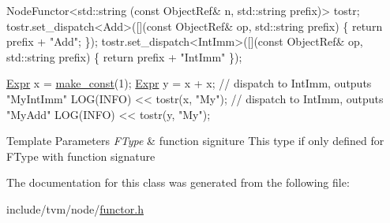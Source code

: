 \begin{DoxyCode}
NodeFunctor<std::string (const ObjectRef& n, std::string prefix)> tostr;
tostr.set\_dispatch<Add>([](\textcolor{keyword}{const} ObjectRef& op, std::string prefix) \{
  \textcolor{keywordflow}{return} prefix + \textcolor{stringliteral}{"Add"};
\});
tostr.set\_dispatch<IntImm>([](\textcolor{keyword}{const} ObjectRef& op, std::string prefix) \{
  \textcolor{keywordflow}{return} prefix + \textcolor{stringliteral}{"IntImm"}
\});

\hyperlink{namespacetvm_1_1relay_a5b84e3790f89bb3fad5c7911eeb99531}{Expr} x = \hyperlink{namespacetvm_1_1tir_a4ea566597880d04bd62fbec687e338b5}{make\_const}(1);
\hyperlink{namespacetvm_1_1relay_a5b84e3790f89bb3fad5c7911eeb99531}{Expr} y = x + x;
\textcolor{comment}{// dispatch to IntImm, outputs "MyIntImm"}
LOG(INFO) << tostr(x, \textcolor{stringliteral}{"My"});
\textcolor{comment}{// dispatch to IntImm, outputs "MyAdd"}
LOG(INFO) << tostr(y, \textcolor{stringliteral}{"My"});
\end{DoxyCode}



\begin{DoxyTemplParams}{Template Parameters}
{\em F\+Type} & function signiture This type if only defined for F\+Type with function signature \\
\hline
\end{DoxyTemplParams}


The documentation for this class was generated from the following file\+:\begin{DoxyCompactItemize}
\item 
include/tvm/node/\hyperlink{functor_8h}{functor.\+h}\end{DoxyCompactItemize}

